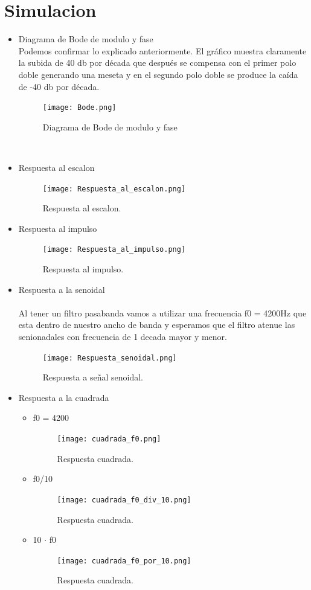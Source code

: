\documentclass[11pt]{diazessay} %
\begin{document}
\newpage
\section*{Simulacion}
\begin{itemize}
\item Diagrama de Bode de modulo y fase \\
Podemos confirmar lo explicado anteriormente. El gráfico muestra claramente la subida de 40 db por década que después se compensa con el primer polo doble generando una meseta y en el segundo polo doble se produce la caída de -40 db por década.\\
\begin{figure}[h]
	\centering
	\texttt{[image: Bode.png]}
\caption{Diagrama de Bode de modulo y fase}
\end{figure}\\
\newpage
\item Respuesta al escalon
\begin{figure}[h]
	\centering
	\texttt{[image: Respuesta\_al\_escalon.png]}
\caption{Respuesta al escalon.}
\end{figure}
\newpage
\item Respuesta al impulso
\begin{figure}[h]
	\centering
	\texttt{[image: Respuesta\_al\_impulso.png]}
\caption{Respuesta al impulso.}
\end{figure}
\item Respuesta a la senoidal \\
\\
Al tener un filtro pasabanda vamos a utilizar una frecuencia f0 = 4200Hz que esta dentro de nuestro ancho de banda y esperamos que el filtro atenue las senionadales con frecuencia de 1 decada mayor y menor.
\begin{figure}[h]
	\centering
	\texttt{[image: Respuesta\_senoidal.png]}
\caption{Respuesta a señal senoidal.}
\end{figure}
\newpage
\item Respuesta a la cuadrada
\begin{itemize}
\item f0 = 4200 \\
	\begin{figure}[h]
		\centering
			\texttt{[image: cuadrada\_f0.png]}
	\caption{Respuesta cuadrada.}
	\end{figure}

\item f0/10
	\begin{figure}[h]
		\centering
			\texttt{[image: cuadrada\_f0\_div\_10.png]}
	\caption{Respuesta cuadrada.}
	\end{figure}
\newpage
\item 10 $\cdot$ f0 \\
	\begin{figure}[h]
		\centering
			\texttt{[image: cuadrada\_f0\_por\_10.png]}
	\caption{Respuesta cuadrada.}
	\end{figure}
\end{itemize}
\end{itemize}
\end{document}
